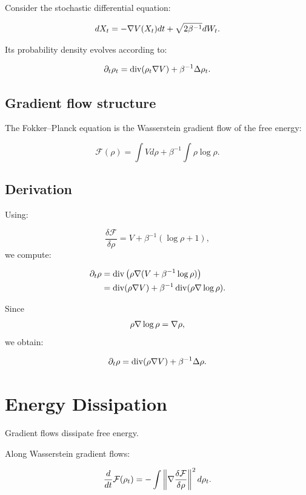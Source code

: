 Consider the stochastic differential equation:

\[
dX_t
=
-\nabla V(X_t)dt
+
\sqrt{2\beta^{-1}}dW_t.
\]

Its probability density evolves according to:

\[
\partial_t \rho_t
=
\operatorname{div}(\rho_t \nabla V)
+
\beta^{-1}\Delta \rho_t.
\]

\subsection{Gradient flow structure}

\begin{theorem}
The Fokker--Planck equation is the Wasserstein gradient flow of the free energy:

\[
\mathcal F(\rho)
=
\int Vd\rho
+
\beta^{-1}
\int \rho\log \rho.
\]
\end{theorem}

\subsection{Derivation}

Using:

\[
\frac{\delta \mathcal F}{\delta \rho}
=
V+\beta^{-1}(\log \rho+1),
\]
we compute:

\begin{align*}
\partial_t \rho
&=
\operatorname{div}
\left(
\rho
\nabla
(V+\beta^{-1}\log \rho)
\right)
\\
&=
\operatorname{div}(\rho\nabla V)
+
\beta^{-1}
\operatorname{div}(\rho\nabla \log \rho).
\end{align*}

Since
\[
\rho\nabla \log \rho = \nabla \rho,
\]
we obtain:

\[
\partial_t \rho
=
\operatorname{div}(\rho\nabla V)
+
\beta^{-1}\Delta \rho.
\]

\section{Energy Dissipation}

Gradient flows dissipate free energy.

\begin{theorem}
Along Wasserstein gradient flows:

\[
\frac{d}{dt}\mathcal F(\rho_t)
=
-
\int
\left\|
\nabla
\frac{\delta \mathcal F}{\delta \rho}
\right\|^2
 d\rho_t.
\]
\end{theorem}

